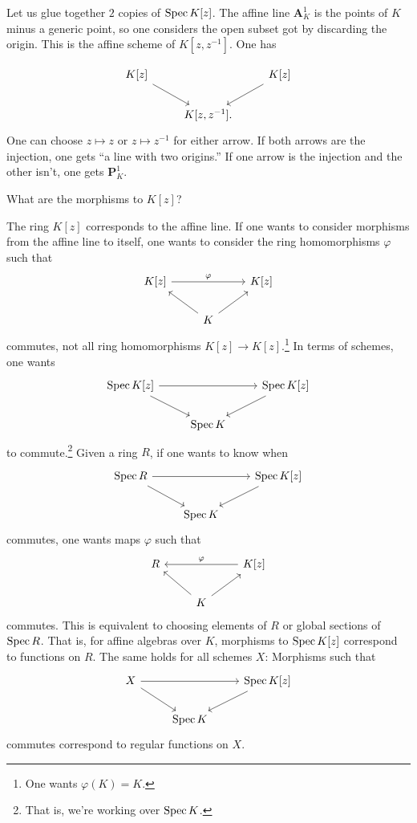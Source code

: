\documentclass [11 pt, oneside] {article}
\begin{document}
\begin{example}[ ]\label{gluing_1}\text{}
Let us glue together $2$ copies of $\operatorname{Spec} K[z]$. The affine line $\mathbf{A}^1_K$ is the points of $K$ minus a generic point, so one considers the open subset got by discarding the origin. This is the affine scheme of $K[z,z^{-1}]$. One has

\[
\begin{tikzcd}
	K[z]\ar[dr] && K[z] \ar[dl]\\
		    &K[z,z^{-1}].
\end{tikzcd}
\]
One can choose $z\longmapsto z$ or $z\longmapsto z^{-1}$ for either arrow. If both arrows are the injection, one gets ``a line with two origins.'' If one arrow is the injection and the other isn't, one gets $\mathbf{P}^1_K$.
\end{example}

\begin{problem}
	What are the morphisms to $K[z]$?
\end{problem}

The ring $K[z]$ corresponds to the affine line. If one wants to consider morphisms from the affine line to itself, one wants to consider the ring homomorphisms $\varphi$ such that
\[
\begin{tikzcd}
	K[z] \ar[rr, "\varphi"] &&K[z] \\
			       &K\ar[lu] \ar[ru]
\end{tikzcd}
\]
commutes, not all ring homomorphisms $K[z] \longrightarrow K[z]$.\footnote{One wants $\varphi(K)=K$.} In terms of schemes, one wants
\[
\begin{tikzcd}
	\Spec K[z] \ar[dr] \ar[rr] &&\Spec K[z] \ar[dl]\\
				   &\Spec K
\end{tikzcd}
\]
to commute.\footnote{That is, we're working over $\operatorname{Spec} K$.} Given a ring $R$, if one wants to know when
\[
\begin{tikzcd}
\Spec R \ar[dr] \ar[rr] &&\Spec K[z] \ar[dl]\\
                                   &\Spec K	
\end{tikzcd}
\]
commutes, one wants maps $\varphi$ such that
\[
\begin{tikzcd}
	R && K[z] \ar[ll,  "\varphi",  swap] \\
	  &K \ar[ul]\ar[ur]
\end{tikzcd}
\]
commutes. This is equivalent to choosing elements of $R$ or global sections of $\operatorname{Spec} R$. That is, for affine algebras over $K$, morphisms to $\operatorname{Spec} K[z]$ correspond to functions on $R$. The same holds for all schemes $X$: Morphisms such that
\[
\begin{tikzcd}
	X \ar[dr] \ar[rr] &&\Spec K[z] \ar[dl]\\
                                   &\Spec K    
\end{tikzcd}
\]
commutes correspond to regular functions on $X$.
\end{document}
